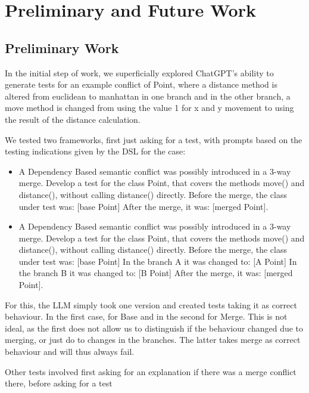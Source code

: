 \chapter{Preliminary and Future Work}\label{chap:chap3}

\section{Preliminary Work}

In the initial step of work, we superficially explored ChatGPT's ability to generate tests for an example conflict of Point, where a distance method is altered from euclidean to manhattan in one branch and in the other branch, a move method is changed from using the value 1 for x and y movement to using the result of the distance calculation.

We tested two frameworks, first just asking for a test, with prompts based on the testing indications given by the DSL for the case:

\begin{itemize}
  \item A Dependency Based semantic conflict was possibly introduced in a 3-way merge. Develop a test for the class Point, that covers the methods move() and distance(), without calling distance() directly.
Before the merge, the class under test was: [base Point]
After the merge, it was: [merged Point].
  \item A Dependency Based semantic conflict was possibly introduced in a 3-way merge. Develop a test for the class Point, that covers the methods move() and distance(), without calling distance() directly.
Before the merge, the class under test was: [base Point]
In the branch A it was changed to: [A Point]
In the branch B it was changed to: [B Point]
After the merge, it was: [merged Point].

\end{itemize}

For this, the LLM simply took one version and created tests taking it as correct behaviour. In the first case, for Base and in the second for Merge. This is not ideal, as the first does not allow us to distinguish if the behaviour changed due to merging, or just do to changes in the branches. The latter takes merge as correct behaviour and will thus always fail.

Other tests involved first asking for an explanation if there was a merge conflict there, before asking for a test

